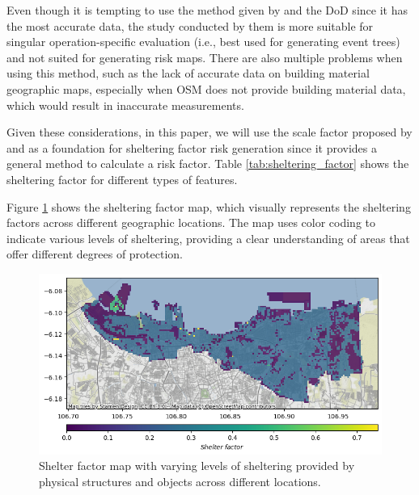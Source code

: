 \documentclass[12pt]{report}
\begin{document}
                Even though it is tempting to use the method given by \cite{melnyk_third-party_2014} and the DoD since
                it has the most accurate data, the study conducted by them is more suitable for singular
                operation-specific evaluation (i.e., best used for generating event trees) and not suited for generating
                risk maps. There are also multiple problems when using this method, such as the lack of accurate data on
                building material geographic maps, especially when OSM does not provide building material data, which
                would result in inaccurate measurements.
                        
                Given these considerations, in this paper, we will use the scale factor proposed by
                \cite{klepeis_national_2001} and \cite{primatesta_ground_2020} as a foundation for sheltering factor
                risk generation since it provides a general method to calculate a risk factor. Table
                \ref{tab:sheltering_factor} shows the sheltering factor for different types of features.
                        
                Figure \ref{fig:shelter_factor_map} shows the sheltering factor map, which visually represents the
                sheltering factors across different geographic locations. The map uses color coding to indicate various
                levels of sheltering, providing a clear understanding of areas that offer different degrees of
                protection.
                     
             \begin{figure}[H]
                 \centering
                 \includegraphics[width=\textwidth]{Plot/shelter_factor.png}
                 \caption{Shelter factor map with varying levels of sheltering provided by physical structures and objects across different locations.}
                 \label{fig:shelter_factor_map}
             \end{figure}
             
\end{document}
